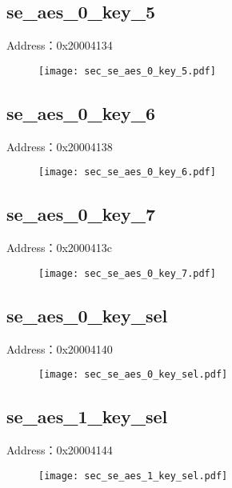\subsection{se\_aes\_0\_key\_5}
\label{sec-se-aes-0-key-5}
Address：0x20004134
 \begin{figure}[H]
\texttt{[image: sec\_se\_aes\_0\_key\_5.pdf]}
\end{figure}

\subsection{se\_aes\_0\_key\_6}
\label{sec-se-aes-0-key-6}
Address：0x20004138
 \begin{figure}[H]
\texttt{[image: sec\_se\_aes\_0\_key\_6.pdf]}
\end{figure}

\subsection{se\_aes\_0\_key\_7}
\label{sec-se-aes-0-key-7}
Address：0x2000413c
 \begin{figure}[H]
\texttt{[image: sec\_se\_aes\_0\_key\_7.pdf]}
\end{figure}

\subsection{se\_aes\_0\_key\_sel}
\label{sec-se-aes-0-key-sel}
Address：0x20004140
 \begin{figure}[H]
\texttt{[image: sec\_se\_aes\_0\_key\_sel.pdf]}
\end{figure}

\subsection{se\_aes\_1\_key\_sel}
\label{sec-se-aes-1-key-sel}
Address：0x20004144
 \begin{figure}[H]
\texttt{[image: sec\_se\_aes\_1\_key\_sel.pdf]}
\end{figure}

